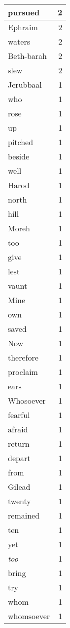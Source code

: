 \begin{center}
\begin{longtable}{l|r}
pursued & 2\\ \hline 
Ephraim & 2\\ \hline 
waters & 2\\ \hline 
Beth-barah & 2\\ \hline 
slew & 2\\ \hline 
Jerubbaal & 1\\ \hline 
who & 1\\ \hline 
rose & 1\\ \hline 
up & 1\\ \hline 
pitched & 1\\ \hline 
beside & 1\\ \hline 
well & 1\\ \hline 
Harod & 1\\ \hline 
north & 1\\ \hline 
hill & 1\\ \hline 
Moreh & 1\\ \hline 
too & 1\\ \hline 
give & 1\\ \hline 
lest & 1\\ \hline 
vaunt & 1\\ \hline 
Mine & 1\\ \hline 
own & 1\\ \hline 
saved & 1\\ \hline 
Now & 1\\ \hline 
therefore & 1\\ \hline 
proclaim & 1\\ \hline 
ears & 1\\ \hline 
Whosoever & 1\\ \hline 
fearful & 1\\ \hline 
afraid & 1\\ \hline 
return & 1\\ \hline 
depart & 1\\ \hline 
from & 1\\ \hline 
Gilead & 1\\ \hline 
twenty & 1\\ \hline 
remained & 1\\ \hline 
ten & 1\\ \hline 
yet & 1\\ \hline 
\emph{too} & 1\\ \hline 
bring & 1\\ \hline 
try & 1\\ \hline 
whom & 1\\ \hline 
whomsoever & 1\\ \hline 

\end{longtable}
\end{center}

